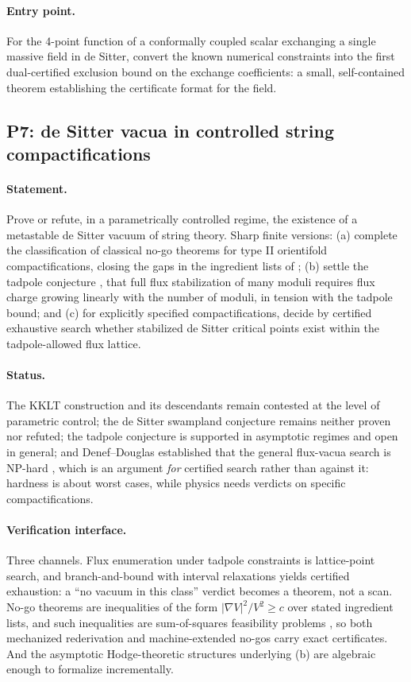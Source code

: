 \documentclass[11pt,letterpaper]{article}
\begin{document}
\paragraph{Entry point.} For the 4-point function of a conformally coupled scalar exchanging a single massive field in de Sitter, convert the known numerical constraints into the first dual-certified exclusion bound on the exchange coefficients: a small, self-contained theorem establishing the certificate format for the field.

\subsection{P7: de Sitter vacua in controlled string compactifications}
\label{sec:p7}

\paragraph{Statement.} Prove or refute, in a parametrically controlled regime, the existence of a metastable de Sitter vacuum of string theory. Sharp finite versions: (a) complete the classification of classical no-go theorems for type II orientifold compactifications, closing the gaps in the ingredient lists of \cite{maldacenanunez2001,hkyt2007}; (b) settle the tadpole conjecture \cite{tadpole2020}, that full flux stabilization of many moduli requires flux charge growing linearly with the number of moduli, in tension with the tadpole bound; and (c) for explicitly specified compactifications, decide by certified exhaustive search whether stabilized de Sitter critical points exist within the tadpole-allowed flux lattice.

\paragraph{Status.} The KKLT construction \cite{kklt2003} and its descendants remain contested at the level of parametric control; the de Sitter swampland conjecture \cite{oosv2018} remains neither proven nor refuted; the tadpole conjecture is supported in asymptotic regimes and open in general; and Denef--Douglas established that the general flux-vacua search is NP-hard \cite{denefdouglas2007}, which is an argument \emph{for} certified search rather than against it: hardness is about worst cases, while physics needs verdicts on specific compactifications.

\paragraph{Verification interface.} Three channels. Flux enumeration under tadpole constraints is lattice-point search, and branch-and-bound with interval relaxations yields certified exhaustion: a ``no vacuum in this class'' verdict becomes a theorem, not a scan. No-go theorems are inequalities of the form $|\nabla V|^2/V^2\ge c$ over stated ingredient lists, and such inequalities are sum-of-squares feasibility problems \cite{parrilo2003}, so both mechanized rederivation and machine-extended no-gos carry exact certificates. And the asymptotic Hodge-theoretic structures underlying (b) are algebraic enough to formalize incrementally.
\end{document}
